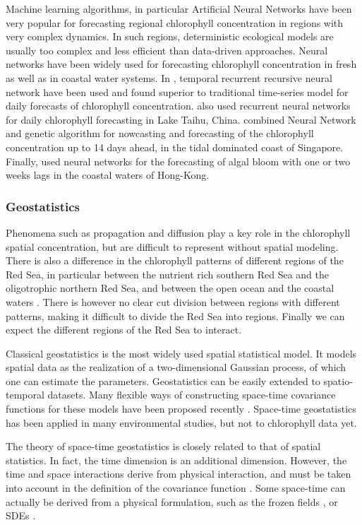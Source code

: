 Machine learning algorithms, in particular Artificial Neural Networks have been very popular for forecasting regional chlorophyll concentration in regions with very complex dynamics. In such regions, deterministic ecological models are usually too complex and less efficient than data-driven approaches. Neural networks have been widely used for forecasting chlorophyll concentration in fresh as well as in coastal water systems. In \cite{Jeong2006}, temporal recurrent recursive neural network have been used and found superior to traditional time-series model for daily forecasts of chlorophyll concentration. \cite{Wang2013} also used recurrent neural networks for daily chlorophyll forecasting in Lake Taihu, China. \cite{Mulia2013} combined Neural Network and genetic algorithm for nowcasting and forecasting of the chlorophyll concentration up to 14 days ahead, in the tidal dominated coast of Singapore. Finally, \cite{Lee2013} used neural networks for the forecasting of algal bloom with one or two weeks lags in the coastal waters of Hong-Kong.

\subsubsection{Geostatistics}

Phenomena such as propagation and diffusion play a key role in the chlorophyll spatial concentration, but are difficult to represent without spatial modeling. There is also a difference in the chlorophyll patterns of different regions of the Red Sea, in particular between the nutrient rich southern Red Sea and the oligotrophic northern Red Sea, and between the open ocean and the coastal waters \cite{Raitsos2013}. There is however no clear cut division between regions with different patterns, making it difficult to divide the Red Sea into regions. Finally we can expect the different regions of the Red Sea to interact.

Classical geostatistics is the most widely used spatial statistical model. It models spatial data as the realization of a two-dimensional Gaussian process, of which one can estimate the parameters. Geostatistics can be easily extended to spatio-temporal datasets. Many flexible ways of constructing space-time covariance functions for these models have been proposed recently \cite{Gneiting2002, Cressie1999, Stein2005}. Space-time geostatistics has been applied in many environmental studies, but not to chlorophyll data yet.

The theory of space-time geostatistics is closely related to that of spatial statistics. In fact, the time dimension is an additional dimension. However, the time and space interactions derive from physical interaction, and must be taken into account in the definition of the covariance function \cite{Gneiting2010}. Some space-time can actually be derived from a physical formulation, such as the frozen fields \cite{Gneiting2010}, or SDEs \cite{Brown2000, North2011}.

